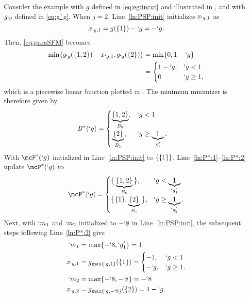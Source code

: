 \documentclass[conference,letterpaper]{IEEEtran}
\begin{document}
Consider the example with $g$ defined in \eqref{eq:eg:incut} and illustrated in , and with $g_{`g}$ defined in \eqref{eq:g`g}.
When $j=2$, Line~\ref{ln:PSP:init} initializes $x_{`g,1}$ as
\begin{align}
	\label{eq:eg:x`g1}
	x_{`g,1} = g(\{1\})-`g = -`g.
\end{align}
Then, \eqref{eq:paraSFM} becomes
\begin{align*}
	\min\Set {g_{`g}(\Set{1,2})-x_{`g,1},g_{`g}(\Set{2}) } %
	&= \min\Set {0,1-`g}\\
	&=\begin{cases}
		1-`g, & `g<1\\
		0 & `g\geq 1,
	\end{cases}
\end{align*}
which is a piecewise linear function plotted in 
. The minimum minimizer is therefore given by
\begin{align}
	\label{eq:eg:B^*:j=1}
	B^*(`g) &=
	\begin{cases}
		\underbrace{\Set {1,2}}_{B_0}, & `g<1\\
		\underbrace{\Set {2}}_{B_1}, & `g\geq \underbrace{1}_{`g'_1}.
	\end{cases}
\end{align} 
With $\mcP^*(`g)$ initialized in Line~\ref{ln:PSP:init} to $\{\{1\}\}$, Line~\ref{ln:P*:1}--\ref{ln:P*:2} update $\mcP^*(`g)$ to
\begin{align}
	\label{eq:eg:j=2:P*}
	\mcP^*(`g) = 
	\begin{cases}
		\big\{\underbrace{\Set {1,2}}_{B_0}\big\}, & `g<\underbrace{1}_{`g'_1}\\
		\big\{\Set {1},\underbrace{\Set {2}}_{B_1}\big\}, & `g\geq \underbrace{1}_{`g'_2}.
	\end{cases}
\end{align}
Next, with $`m_1$ and $`m_2$ initialized to $-`8$ in Line~\ref{ln:PSP:init}, the subsequent steps following Line~\ref{ln:P*:2} give
\begin{subequations}
	\label{eq:eg:x`m:j=3}
\begin{align}
	`m_1 &=\max\Set {-`8,`g'_1}=1\\
	x_{`g,1} &= g_{\max \Set {`g,1}}(\Set {1}) 
	= %
	\begin{cases}
		-1, & `g<1\\
		-`g, & `g\geq 1.
	\end{cases}\\
	`m_2 &=\max\Set {-`8,-`8}=-`8\\
	x_{`g,2} &= g_{\max \Set {`g,-`8}}(\Set {2}) = 1-`g.
\end{align}
\end{subequations}
\end{document}
